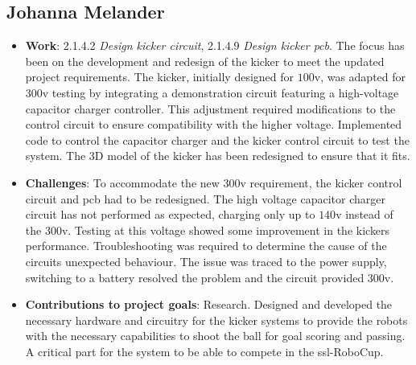 \subsection*{Johanna Melander}
\begin{itemize}
    \item \textbf{Work}: 
    2.1.4.2 \textit{Design kicker circuit}, 2.1.4.9 \textit{Design kicker \acs{pcb}}. The focus has been on the development and redesign of the kicker to meet the updated project requirements. 
    The kicker, initially designed for $100$\:\ac{v}, was adapted for $300$\:\ac{v} testing by integrating a demonstration circuit featuring a high-voltage capacitor charger controller. 
    This adjustment required modifications to the control circuit to ensure compatibility with the higher voltage. 
    Implemented code to control the capacitor charger and the kicker control circuit to test the system. 
    The 3D model of the kicker has been redesigned to ensure that it fits. 
    \item \textbf{Challenges}: 
    To accommodate the new $300$\:\ac{v} requirement, the kicker control circuit and \ac{pcb} had to be redesigned.
    The high voltage capacitor charger circuit has not performed as expected, charging only up to $140$\:\ac{v} instead of the $300$\:\ac{v}. Testing at this voltage showed some improvement in the kickers performance. Troubleshooting was required to determine the cause of the circuits unexpected behaviour. The issue was traced to the power supply, switching to a battery resolved the problem and the circuit provided $300$\:\ac{v}.    
    \item \textbf{Contributions to project goals}: 
    Research. Designed and developed the necessary hardware and circuitry for the kicker systems to provide the robots with the necessary capabilities to shoot the ball for goal scoring and passing. A critical part for the system to be able to compete in the \ac{ssl}-RoboCup.
\end{itemize}
